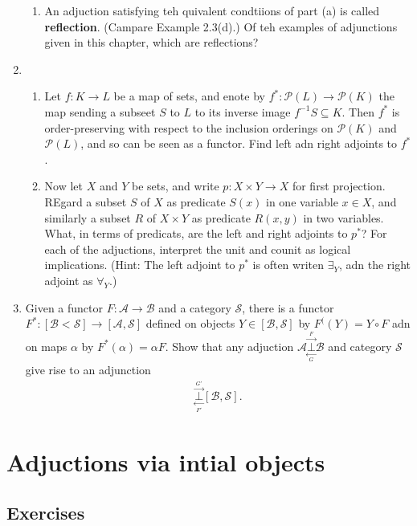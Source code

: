 \documentclass[12pt,a4paper]{report}
\newcommand{\ADJOINT}[2]{\underset{\underset{#2}\longleftarrow}{\overset{\overset{#1}\longrightarrow}\bot }}
\newcommand{\CAT}[1]{\mathscr{#1}}
\begin{document}
\begin{enumerate}[label=\textbf{2.2.\arabic*}]
\begin{enumerate}[label=(\alph*)]
		\item An adjuction satisfying teh quivalent condtiions of part (a) is called \textbf{reflection}.  (Campare Example 2.3(d).)  Of teh examples of adjunctions given in this chapter, which are reflections?
	\end{enumerate}
	
	\item \begin{enumerate}[label=(\alph*)]
	
		\item Let $f: K \to L$ be a map of sets, and enote by $f^*: \CAT{P}(L) \to \CAT{P}(K)$ the map sending a subseet $S$ to $L$ to its inverse image $f^{-1}S\subseteq K$.  Then $f^*$ is order-preserving with respect to the inclusion orderings on $\CAT{P}(K)$ and $\CAT{P}(L)$, and so can be seen as a functor.  Find left adn right adjoints to $f^*$.
		
		\item Now let $X$ and $Y$ be sets, and write $p : X\times Y \to X$ for first projection.  REgard a subset $S$ of $X$ as predicate $S(x)$ in one variable $x \in X$, and similarly a subset $R$ of $X\times Y$ as predicate $R(x,y)$ in two variables.  What, in terms of predicats, are the left and right adjoints to $p^*$?  For each of the adjuctions, interpret the unit and counit as logical implications.  (Hint:  The left adjoint to $p^*$ is often writen $\exists_Y$, adn the right adjoint as $\forall_Y$.)
		
	\end{enumerate}
	
	\item Given a functor $F:\CAT{A} \to \CAT{B}$ and a category $\CAT{S}$, there is a functor $F^*:[\CAT{B}<\CAT{S}]\to [\CAT{A},\CAT{S}]$ defined on objects $Y \in [\CAT{B}, \CAT{S}]$ by $F^((Y)=Y\circ F$ adn on maps $\alpha$ by $F^*(\alpha)=\alpha F$.  Show that any adjuction $\CAT{A}\ADJOINT{F}{G}\CAT{B}$ and category $\CAT{S}$ give rise to an adjunction
	\begin{align*}
		[\CAT{A},\CAT{S}]\ADJOINT{G'}{F'}[\CAT{B}, \CAT{S}].
	\end{align*}


\end{enumerate}

\section{Adjuctions via intial objects}

\subsection{Exercises}
\end{document}
